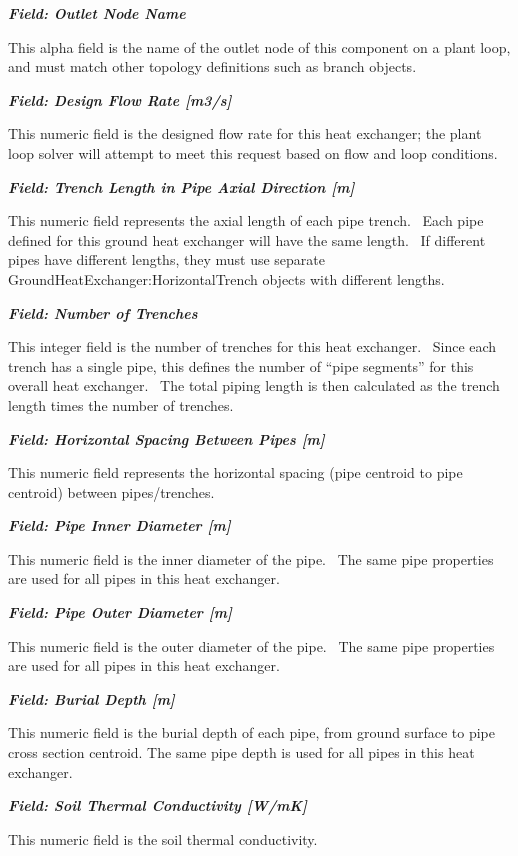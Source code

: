 \textbf{\emph{Field: Outlet Node Name}}

This alpha field is the name of the outlet node of this component on a plant loop, and must match other topology definitions such as branch objects.

\textbf{\emph{Field: Design Flow Rate {[}m3/s{]}}}

This numeric field is the designed flow rate for this heat exchanger; the plant loop solver will attempt to meet this request based on flow and loop conditions.

\textbf{\emph{Field: Trench Length in Pipe Axial Direction {[}m{]}}}

This numeric field represents the axial length of each pipe trench.~ Each pipe defined for this ground heat exchanger will have the same length.~ If different pipes have different lengths, they must use separate GroundHeatExchanger:HorizontalTrench objects with different lengths.

\textbf{\emph{Field: Number of Trenches}}

This integer field is the number of trenches for this heat exchanger.~ Since each trench has a single pipe, this defines the number of ``pipe segments'' for this overall heat exchanger.~ The total piping length is then calculated as the trench length times the number of trenches.

\textbf{\emph{Field: Horizontal Spacing Between Pipes {[}m{]}}}

This numeric field represents the horizontal spacing (pipe centroid to pipe centroid) between pipes/trenches.

\textbf{\emph{Field: Pipe Inner Diameter {[}m{]}}}

This numeric field is the inner diameter of the pipe.~ The same pipe properties are used for all pipes in this heat exchanger.

\textbf{\emph{Field: Pipe Outer Diameter {[}m{]}}}

This numeric field is the outer diameter of the pipe.~ The same pipe properties are used for all pipes in this heat exchanger.

\textbf{\emph{Field: Burial Depth {[}m{]}}}

This numeric field is the burial depth of each pipe, from ground surface to pipe cross section centroid. The same pipe depth is used for all pipes in this heat exchanger.

\textbf{\emph{Field: Soil Thermal Conductivity {[}W/mK{]}}}

This numeric field is the soil thermal conductivity.

